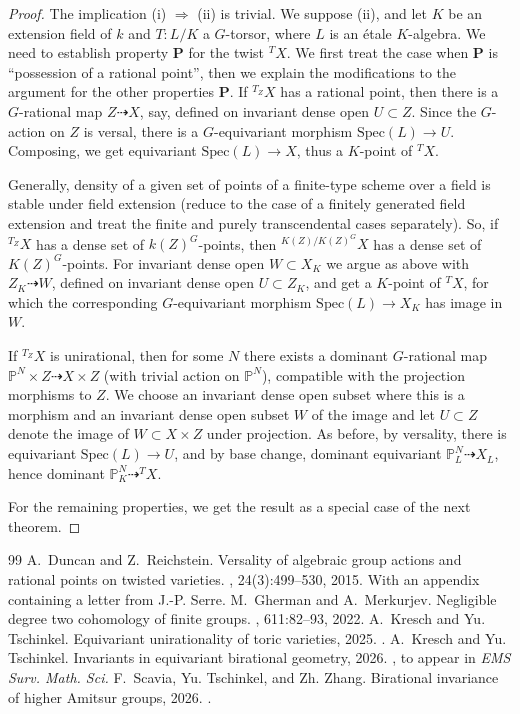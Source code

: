 \documentclass[10pt,a4paper]{amsart}
\numberwithin{equation}{section}
\def\bP{{\mathbb P}}
\def\Spec{\mathrm{Spec}}
\begin{document}
\begin{proof}
The implication (i) $\Rightarrow$ (ii) is trivial.
We suppose (ii), and let
$K$ be an extension field of $k$ and
$T\colon L/K$ a $G$-torsor, where
$L$ is an \'etale $K$-algebra.
We need to establish property $\mathbf{P}$
for the twist ${}^TX$.
We first treat the case when $\mathbf{P}$ is ``possession of a rational point'', then we explain the modifications to the argument for
the other properties $\mathbf{P}$.
If ${}^{T_Z}X$ has a rational point, then there is a $G$-rational map $Z\dashrightarrow X$, say, defined on
invariant dense open $U\subset Z$.
Since the $G$-action on $Z$ is versal, there is a $G$-equivariant morphism $\Spec(L)\to U$.
Composing, we get equivariant $\Spec(L)\to X$, thus a $K$-point of ${}^TX$.

Generally, density of a given set of points of a finite-type scheme over a field is stable under field extension (reduce to the case of a finitely generated field extension and treat the finite and purely transcendental cases separately).
So, if ${}^{T_Z}X$ has a dense set of $k(Z)^G$-points, then
${}^{K(Z)/K(Z)^G}X$ has a dense set of $K(Z)^G$-points.
For invariant dense open $W\subset X_K$ we argue as above with $Z_K\dashrightarrow W$, defined on invariant dense open $U\subset Z_K$, and get a $K$-point of ${}^TX$, for which the corresponding $G$-equivariant morphism $\Spec(L)\to X_K$ has image in $W$.

If ${}^{T_Z}X$ is unirational, then for some $N$ there exists a dominant $G$-rational map $\bP^N\times Z\dashrightarrow X\times Z$ (with trivial action on $\bP^N$), compatible with the projection morphisms to $Z$.
We choose an invariant dense open subset where this is a morphism and an invariant dense open subset $W$ of the image and let $U\subset Z$ denote the image of $W\subset X\times Z$ under projection.
As before, by versality, there is equivariant $\Spec(L)\to U$, and by base change, dominant equivariant $\bP^N_L\dashrightarrow X_L$, hence dominant $\bP^N_K\dashrightarrow {}^TX$.

For the remaining properties, we get the result as a special case of the next theorem.
\end{proof}


\begin{thebibliography}{99}
 A.~Duncan and Z.~Reichstein. \newblock Versality of algebraic group actions and rational points on twisted varieties. , 24(3):499--530, 2015. \newblock With an appendix containing a letter from J.-P. Serre.
 M.~Gherman and A.~Merkurjev. \newblock Negligible degree two cohomology of finite groups. , 611:82--93, 2022.
 A.~Kresch and Yu. Tschinkel. \newblock Equivariant unirationality of toric varieties, 2025. .
 A.~Kresch and Yu. Tschinkel. \newblock Invariants in equivariant birational geometry, 2026. , to appear in {\em EMS Surv. Math. Sci.}
 F.~Scavia, Yu. Tschinkel, and Zh. Zhang. \newblock Birational invariance of higher {A}mitsur groups, 2026. .
\end{thebibliography}
\end{document}
